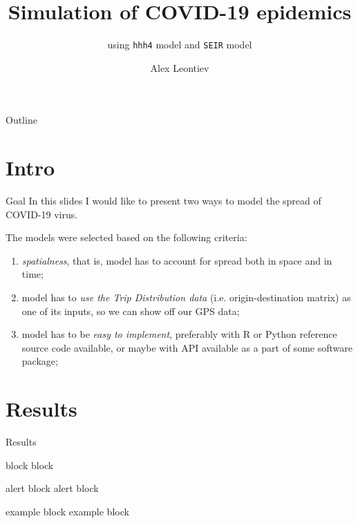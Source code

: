 \documentclass[pdf,notes]{beamer}
\title{Simulation of COVID-19 epidemics}
\subtitle{using \texttt{hhh4} model and \texttt{SEIR} model}
\author{Alex Leontiev}
\institute{Datawise Inc.}
\begin{document}
\begin{frame}\titlepage\end{frame}
\begin{frame}{Outline}
  \tableofcontents
\end{frame}
\section{Intro}
\begin{frame}{Goal}
	In this slides I would like to present two ways to model the spread of COVID-19 virus.

	The models were selected based on the following criteria:
	\begin{enumerate}
		\item \textit{spatialness}, that is, model has to account for spread both in space and in time;
		\item model has to {\it use the Trip Distribution data} (i.e. origin-destination matrix) 
			as one of its inputs,
			so we can show off our GPS data;
		\item model has to be \textit{easy to implement}, preferably with R or Python reference source
			code available, or maybe with API available as a part of some software package;
	\end{enumerate}
\end{frame}
\section{Results}
\begin{frame}{Results}
\begin{block}{block}
    block
    \end{block}
    \begin{alertblock}{alert block}
    alert block
    \end{alertblock}
    \begin{exampleblock}{example block}
    example block
    \end{exampleblock}
\end{frame}
\end{document}
